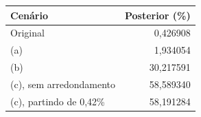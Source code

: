 \begin{tabular}{lr}
\toprule
Cenário & Posterior (\%) \\
\midrule
Original & 0,426908 \\
(a) & 1,934054 \\
(b) & 30,217591 \\
(c), sem arredondamento & 58,589340 \\
(c), partindo de 0,42\% & 58,191284 \\
\bottomrule
\end{tabular}
